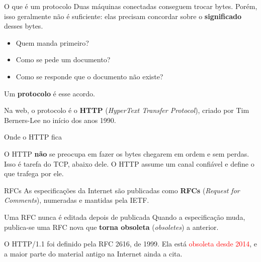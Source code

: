\documentclass{beamer}
\newcommand{\tcr}[1]{\textcolor{red}{#1}}
\begin{document}
\begin{frame}{O que é um protocolo}
  Duas máquinas conectadas conseguem trocar bytes. Porém, isso geralmente não é
  suficiente: elas precisam concordar sobre o \textbf{significado} desses bytes.

  \begin{itemize}
    \item Quem manda primeiro?
    \item Como se pede um documento?
    \item Como se responde que o documento não existe?
  \end{itemize}

  \vspace{0.3cm}
  Um \textbf{protocolo} é esse acordo.

  \vspace{0.3cm}
  Na web, o protocolo é o \textbf{HTTP} (\textit{HyperText Transfer Protocol}),
  criado por Tim Berners-Lee no início dos anos 1990.
\end{frame}

\begin{frame}{Onde o HTTP fica}
  \begin{center}
  \end{center}

  O HTTP \textbf{não} se preocupa em fazer os bytes chegarem em ordem e sem
  perdas. Isso é tarefa do TCP, abaixo dele. O HTTP assume um canal confiável e
  define o que trafega por ele.
\end{frame}

\begin{frame}{RFCs}
  As especificações da Internet são publicadas como \textbf{RFCs}
  (\textit{Request for Comments}), numeradas e mantidas pela IETF.

  \begin{alertblock}{Uma RFC nunca é editada depois de publicada}
    Quando a especificação muda, publica-se uma RFC nova que \textbf{torna
    obsoleta} (\textit{obsoletes}) a anterior.
  \end{alertblock}

  O HTTP/1.1 foi definido pela RFC 2616, de 1999. Ela está \tcr{obsoleta desde
  2014}, e a maior parte do material antigo na Internet ainda a cita.
\end{frame}
\end{document}
